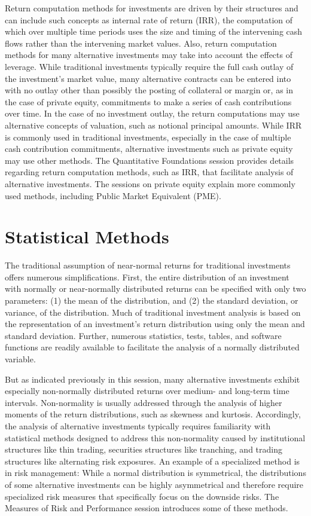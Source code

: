 \documentclass[11pt]{article}
\begin{document}
Return computation methods for investments are driven by their structures and can include such concepts as internal rate of return (IRR), the computation of which over multiple time periods uses the size and timing of the intervening cash flows rather than the intervening market values. Also, return computation methods for many alternative investments may take into account the effects of leverage. While traditional investments typically require the full cash outlay of the investment's market value, many alternative contracts can be entered into with no outlay other than possibly the posting of collateral or margin or, as in the case of private equity, commitments to make a series of cash contributions over time. In the case of no investment outlay, the return computations may use alternative concepts of valuation, such as notional principal amounts. While IRR is commonly used in traditional investments, especially in the case of multiple cash contribution commitments, alternative investments such as private equity may use other methods. The Quantitative Foundations session provides details regarding return computation methods, such as IRR, that facilitate analysis of alternative investments. The sessions on private equity explain more commonly used methods, including Public Market Equivalent (PME).

\section*{Statistical Methods}
The traditional assumption of near-normal returns for traditional investments offers numerous simplifications. First, the entire distribution of an investment with normally or near-normally distributed returns can be specified with only two parameters: (1) the mean of the distribution, and (2) the standard deviation, or variance, of the distribution. Much of traditional investment analysis is based on the representation of an investment's return distribution using only the mean and standard deviation. Further, numerous statistics, tests, tables, and software functions are readily available to facilitate the analysis of a normally distributed variable.

But as indicated previously in this session, many alternative investments exhibit especially non-normally distributed returns over medium- and long-term time intervals. Non-normality is usually addressed through the analysis of higher moments of the return distributions, such as skewness and kurtosis. Accordingly, the analysis of alternative investments typically requires familiarity with statistical methods designed to address this non-normality caused by institutional structures like thin trading, securities structures like tranching, and trading structures like alternating risk exposures. An example of a specialized method is in risk management: While a normal distribution is symmetrical, the distributions of some alternative investments can be highly asymmetrical and therefore require specialized risk measures that specifically focus on the downside risks. The Measures of Risk and Performance session introduces some of these methods.
\end{document}

